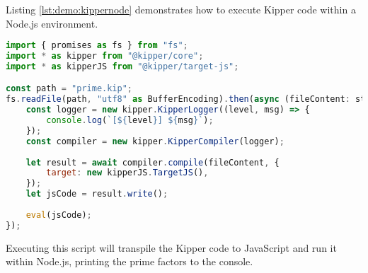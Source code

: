 Listing \ref{lst:demo:kippernode} demonstrates how to execute Kipper code within a Node.js environment.

\begin{lstlisting}[language=JavaScript,caption=Executing Kipper code in Node.js, label=lst:demo:kippernode]
import { promises as fs } from "fs";
import * as kipper from "@kipper/core";
import * as kipperJS from "@kipper/target-js";

const path = "prime.kip";
fs.readFile(path, "utf8" as BufferEncoding).then(async (fileContent: string) => {
	const logger = new kipper.KipperLogger((level, msg) => {
		console.log(`[${level}] ${msg}`);
	});
	const compiler = new kipper.KipperCompiler(logger);
	
	let result = await compiler.compile(fileContent, {
		target: new kipperJS.TargetJS(),
	});
	let jsCode = result.write();
	
	eval(jsCode);
});
\end{lstlisting}

Executing this script will transpile the Kipper code to JavaScript and run it within Node.js, printing the prime factors to the console.
